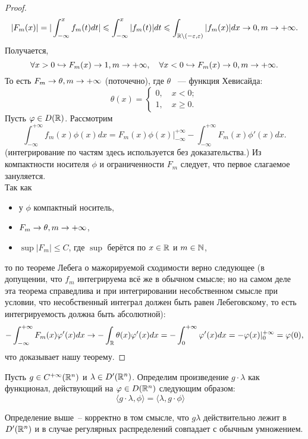 \begin{proof}
    \[
    |F_m(x)| = |\int_{-\infty}^x f_m(t)dt| \leqslant \int_{-\infty}^x |f_m(t)|dt \leqslant \int_{\mathbb{R} \setminus (-\varepsilon, \varepsilon)} |f_m(x)|dx \rightarrow 0, m \rightarrow +\infty.
    \]
    Получается,
    \[
    \forall x > 0 \hookrightarrow F_m(x) \rightarrow 1, m \rightarrow +\infty, \quad \forall x < 0 \hookrightarrow F_m(x) \rightarrow 0, m \rightarrow +\infty.
    \]
    То есть $F_m \rightarrow \theta, m \rightarrow +\infty$ (поточечно), где $\theta$ ~--- функция Хевисайда:
    \[
    \theta(x) = \begin{cases}
                   0,\quad x < 0; \\
                   1,\quad x \geq 0.
        \end{cases}
    \]
    Пусть $\varphi \in D(\mathbb{R})$. Рассмотрим
    \[
        \int_{-\infty}^{+\infty} f_m(x)\phi(x)dx = F_m(x)\phi(x)\bigg|^{+\infty}_{-\infty} - \int_{-\infty}^{+\infty} F_m(x)\phi'(x)dx.
    \]
    (интегрирование по частям здесь используется без доказательства.)
    Из компактности носителя $\phi$ и ограниченности $F_m$ следует, что первое слагаемое зануляется.\\
    Так как 
    \begin{itemize}
        \item у $\phi$ компактный носитель,
        \item $F_m \rightarrow \theta, m \rightarrow +\infty$,
        \item $\sup |F_m| \leq C$, где $\sup$ берётся по $x\in \mathbb{R}$ и $m \in \mathbb{N}$,
    \end{itemize}
    то по теореме Лебега о мажорируемой сходимости верно следующее (в допущении, что $f_m$ интегрируема всё же в обычном смысле; но на самом деле эта теорема справедлива и при интегрировании несобственном смысле при условии, что несобственный интеграл должен быть равен Лебеговскому, то есть интегрируемость должна быть абсолютной):
    \[
        -\int_{-\infty}^{+\infty} F_m(x)\varphi'(x)dx \rightarrow -\int_{\mathbb{R}} \theta(x)\varphi'(x)dx = -\int_0^{+\infty} \varphi'(x)dx = -\varphi(x)|^{+\infty}_0 = \varphi(0),
    \]
    что доказывает нашу теорему.
\end{proof}
\begin{definition}
    Пусть $g \in C^{+\infty}(\mathbb{R}^n)$ и $\lambda \in D'(\mathbb{R}^n)$.
    Определим произведение $g\cdot\lambda$ как функционал, действующий на $\varphi \in D(\mathbb{R}^n)$ следующим образом:
    \[
        \langle g \cdot \lambda, \phi \rangle = \langle \lambda, g \cdot \phi \rangle \quad \tag{$\ast$}
    \]
\end{definition}
\begin{theorem}
    Определение выше~-- корректно в том смысле, что $g\lambda$ действительно лежит в $D'(\mathbb{R}^n)$ и в случае регулярных распределений совпадает с обычным умножением.
\end{theorem}
